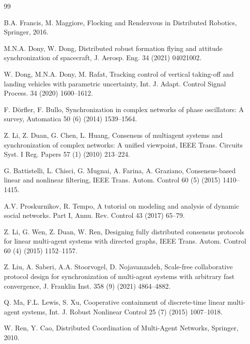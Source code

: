 \documentclass[12pt]{elsarticle}
\theoremstyle{remark}
\begin{document}
\begin{thebibliography}{99}

B.A. Francis, M. Maggiore, Flocking and Rendezvous in Distributed Robotics, Springer, 2016.

M.N.A. Dony, W. Dong, Distributed robust formation flying and attitude synchronization of spacecraft, J. Aerosp. Eng. 34 (2021) 04021002.

W. Dong, M.N.A. Dony, M. Rafat, Tracking control of vertical taking-off and landing vehicles with parametric uncertainty, Int. J. Adapt. Control Signal Process. 34 (2020) 1600--1612.

F. D\"{o}rfler, F. Bullo, Synchronization in complex networks of phase oscillators: A survey, Automatica 50 (6) (2014) 1539--1564.

Z. Li, Z. Duan, G. Chen, L. Huang, Consensus of multiagent systems and synchronization of complex networks: A unified viewpoint, IEEE Trans. Circuits Syst. I Reg. Papers 57 (1) (2010) 213--224.

G. Battistelli, L. Chisci, G. Mugnai, A. Farina, A. Graziano, Consensus-based linear and nonlinear filtering, IEEE Trans. Autom. Control 60 (5) (2015) 1410--1415.

A.V. Proskurnikov, R. Tempo, A tutorial on modeling and analysis of dynamic social networks. Part I, Annu. Rev. Control 43 (2017) 65--79.

Z. Li, G. Wen, Z. Duan, W. Ren, Designing fully distributed consensus protocols for linear multi-agent systems with directed graphs, IEEE Trans. Autom. Control 60 (4) (2015) 1152--1157.

Z. Liu, A. Saberi, A.A. Stoorvogel, D. Nojavanzadeh, Scale-free collaborative protocol design for synchronization of multi-agent systems with arbitrary fast convergence, J. Franklin Inst. 358 (9) (2021) 4864--4882.

Q. Ma, F.L. Lewis, S. Xu, Cooperative containment of discrete-time linear multi-agent systems, Int. J. Robust Nonlinear Control 25 (7) (2015) 1007--1018.

W. Ren, Y. Cao, Distributed Coordination of Multi-Agent Networks, Springer, 2010.


\end{thebibliography}
\end{document}

